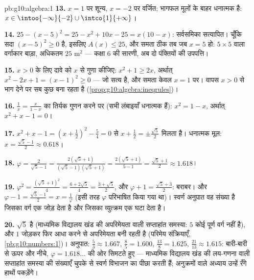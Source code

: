 \begin{solution}{pb:g10:algebra:1}
\textbf{13.} $x = 1$ पर शून्य, $x = -2$ पर वर्जित; भागफल मूलों के बाहर धनात्मक
है: $x \in \intoo{-\infty}{-2} \cup \intco{1}{+\infty}$।

\textbf{14.} $25 - (x - 5)^2 = 25 - x^2 + 10x - 25 =
x(10 - x)$: सर्वसमिका सत्यापित। चूँकि सदा $(x-5)^2 \geq 0$ है, इसलिए $A(x) \leq 25$, और
समता ठीक तब जब $x = 5$ हो: $5 \times 5$ वाला वर्गाकार बाड़ा, अधिकतम $25$ m$^2$ ---
कक्षा 6 की सारणी, अब दो पंक्तियों की उपपत्ति।

\textbf{15.} $x > 0$ के लिए दावे को $x$ से गुणा कीजिए: $x^2 + 1 \geq 2x$, अर्थात् $x^2 - 2x + 1 = (x - 1)^2 \geq 0$
--- जो सत्य है, और समता केवल $x = 1$ पर। वापस $x > 0$ से भाग देने पर सब कुछ बना
रहता है (\cref{prop:g10:algebra:ineqrules})।

\textbf{16.} $\frac1x = \frac{x}{1 - x}$ का तिर्यक गुणन करने पर (सभी लंबाइयाँ धनात्मक हैं):
$x^2 = 1 - x$, अर्थात् $x^2 + x - 1 = 0$।

\textbf{17.} $x^2 + x - 1 = \left(x + \frac12\right)^2 -
\frac54 = 0$ से $x + \frac12 = \pm\frac{\sqrt5}{2}$ मिलता है। धनात्मक मूल: $x = \frac{\sqrt5 - 1}{2} \approx 0.618$।

\textbf{18.} $\varphi = \frac{2}{\sqrt5 - 1} =
\frac{2(\sqrt5 + 1)}{(\sqrt5 - 1)(\sqrt5 + 1)}
= \frac{2(\sqrt5 + 1)}{5 - 1} = \frac{\sqrt5 + 1}{2}
\approx 1.618$।

\textbf{19.} $\varphi^2 = \frac{(\sqrt5 + 1)^2}{4} =
\frac{6 + 2\sqrt5}{4} = \frac{3 + \sqrt5}{2}$, और $\varphi + 1 = \frac{\sqrt5 + 3}{2}$: बराबर। और $\varphi - 1 = \frac{\sqrt5 - 1}{2} = x = \frac1\varphi$ (इसी तरह $\varphi$ परिभाषित किया
गया था)। स्वर्ण अनुपात वह संख्या है जिसका वर्ग एक जोड़ देता है और जिसका
व्युत्क्रम एक घटा देता है।

\textbf{20.} $\sqrt5$  है (माध्यमिक विद्यालय खंड की अपरिमेयता वाली
सप्ताहांत समस्या: $5$ कोई पूर्ण वर्ग नहीं है), और $1$ जोड़कर फिर आधा
करने से अपरिमेयता बनी रहती है (परिमेय संक्रियाएँ, \cref{pb:g10:numbers:1})। अनुपात: $\frac53 \approx 1.667$,
$\frac85 = 1.600$, $\frac{13}{8} = 1.625$, $\frac{21}{13} \approx 1.615$: बारी-बारी से ऊपर और नीचे, $\varphi = 1.618\ldots$ की ओर सिमटते हुए ---
माध्यमिक विद्यालय खंड की लय-गणना वाली सप्ताहांत समस्या की संख्याएँ चुपके से
स्वर्ण विभाजन का पीछा करती हैं; अनुक्रमों वाले अध्याय उन्हें रँगे हाथों
पकड़ेंगे।
\end{solution}
